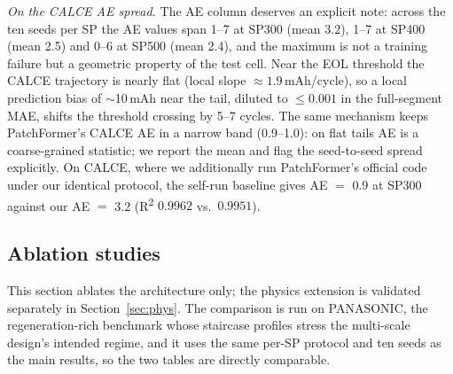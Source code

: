 \emph{On the CALCE AE spread.} The AE column deserves an
explicit note: across the ten seeds per SP the AE values span
1--7 at SP300 (mean 3.2), 1--7 at SP400 (mean 2.5) and 0--6 at
SP500 (mean 2.4), and the maximum is not a training failure but a
geometric property of the test cell. Near the EOL threshold the
CALCE trajectory is nearly flat (local slope $\approx 1.9$\,mAh/cycle),
so a local
prediction bias of $\sim$10\,mAh near the tail, diluted
to $\le 0.001$ in the full-segment MAE, shifts the threshold
crossing by 5--7 cycles.
The same mechanism keeps PatchFormer's CALCE AE in a narrow band
(0.9--1.0): on flat tails AE is a coarse-grained statistic; we report the
mean and flag the seed-to-seed spread explicitly. On CALCE, where we
additionally run PatchFormer's official code under our identical
protocol, the self-run baseline gives AE $=$ 0.9 at SP300 against our
AE $=$ 3.2 (R\textsuperscript{2} $0.9962$ vs.\ $0.9951$).

\subsection{Ablation studies}
\label{sec:ablation}

This section ablates the architecture only; the physics extension is
validated separately in Section~\ref{sec:phys}. The comparison is run
on PANASONIC, the regeneration-rich benchmark whose staircase profiles
stress the multi-scale design's intended regime, and it uses the same
per-SP protocol and ten seeds as the main results, so the two tables
are directly comparable.

